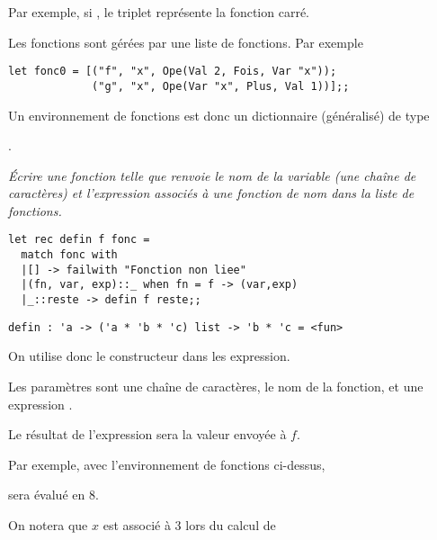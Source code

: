 Par exemple, si , le triplet  représente la fonction carré.

Les fonctions sont gérées par une liste de fonctions. Par exemple
\begin{lstlisting}
let fonc0 = [("f", "x", Ope(Val 2, Fois, Var "x")); 
             ("g", "x", Ope(Var "x", Plus, Val 1))];;
\end{lstlisting}

Un environnement de fonctions est donc un dictionnaire (généralisé) de type 

.
\begin{Exercise}\it
Écrire une fonction  
telle que  renvoie le nom de la variable (une chaîne de caractères) et l'expression associés à une fonction de nom  dans la liste de fonctions.
\end{Exercise}
\begin{Answer}
\begin{lstlisting}
let rec defin f fonc =
  match fonc with
  |[] -> failwith "Fonction non liee"
  |(fn, var, exp)::_ when fn = f -> (var,exp)
  |_::reste -> defin f reste;;
\end{lstlisting} 
\end{Answer}
\begin{lstlisting}
defin : 'a -> ('a * 'b * 'c) list -> 'b * 'c = <fun>
\end{lstlisting}
\medskip

On utilise donc le constructeur  dans les expression.

Les paramètres sont une chaîne de caractères, le nom de la fonction, et une expression . 

Le résultat de l'expression  sera la valeur envoyée à $f$.

Par exemple, avec l'environnement de fonctions ci-dessus,

 sera évalué en $8$.

On notera que $x$ est associé à 3 lors du calcul de  

